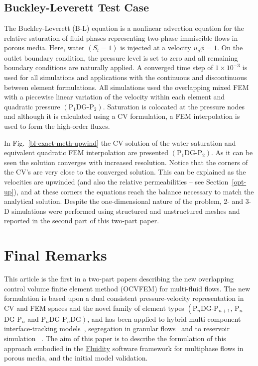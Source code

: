 \documentclass[preprint,authoryear,12pt]{elsarticle}
\begin{document}
\subsection{Buckley-Leverett Test Case}
The Buckley-Leverett (B-L) equation is a nonlinear advection equation for the relative saturation of fluid phases representing two-phase immiscible flows in porous media. Here, water $\left(S_{l}=1\right)$ is injected at a velocity $u_{g}\phi=1$. On the outlet boundary condition, the pressure level is set to zero and all remaining boundary conditions are naturally applied. A converged time step of $1\times 10^{-3}$ is used for all simulations and applications with the continuous and discontinuous between element formulations. All simulations used the overlapping mixed FEM with a piecewise linear variation of the velocity within each element and quadratic pressure $\left(\text{P}_{1}\text{DG-P}_{2}\right)$. Saturation is colocated at the pressure nodes and although it is calculated using a CV formulation, a FEM interpolation is used to form the high-order fluxes.

In Fig.~\ref{bl-exact-meth-upwind} the CV solution of the water saturation and equivalent quadratic FEM interpolation are presented $\left(\text{P}_{1}\text{DG-P}_{2}\right)$. As it can be seen the solution converges with increased resolution. Notice that the corners of the CV's are very close to the converged solution. This can be explained as the velocities are upwinded (and also the relative permeabilities -- see Section~\ref{opt-up}), and at these corners the equations reach the balance necessary to match the analytical solution. Despite the one-dimensional nature of the problem, 2- and 3-D simulations were performed using structured and unstructured meshes and reported in the second part of this two-part paper.


\section{Final Remarks}\label{conc}
This article is the first in a two-part papers describing the new overlapping control volume finite element method (OCVFEM) for multi-fluid flows. The new formulation is based upon a dual consistent pressure-velocity representation in CV and FEM spaces and the novel family of element types $\left(\text{P}_{n}\text{DG-P}_{n+1}\right.$, P$_{n}$DG-P$_{n}$ and $\left.\text{P}_{n}\text{DG-P}_{n}\text{DG}\right)$, and has been applied to hybrid multi-component interface-tracking models~\citep{pavlidis_2013b,pavlidis_2014,xie_2014}, segregation in granular flows~\citep{percival_2014} and to reservoir simulation~ \citep{jackson_2013}. The aim of this paper is to describe the formulation of this approach embodied in the \href{http://www3.imperial.ac.uk/earthscienceandengineering/research/amcg/fluidity}{Fluidity} software framework for multiphase flows in porous media, and the initial model validation.
\end{document}
